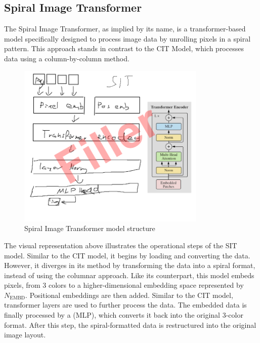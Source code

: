 

\subsection{Spiral Image Transformer}

    The Spiral Image Transformer, as implied by its name, is a transformer-based model specifically designed to process image data by unrolling pixels in a spiral pattern. This approach stands in contrast to the CIT Model, which processes data using a column-by-column method.

    \begin{figure}[H]
        \centering
        \includegraphics[width=0.8\textwidth]{imgs/SITModel.png}
        \caption{Spiral Image Transformer model structure}
        \label{fig:SpiralImageTransformer}
    \end{figure}

    The visual representation above illustrates the operational steps of the SIT model. Similar to the CIT model, it begins by loading and converting the data. However, it diverges in its method by transforming the data into a spiral format, instead of using the columnar approach. Like its counterpart, this model embeds pixels, from 3 colors to a higher-dimensional embedding space represented by \(N_{\text{EMBD}}\). Positional embeddings are then added. Similar to the CIT model, transformer layers are used to further process the data. The embedded data is finally processed by a (MLP), which converts it back into the original 3-color format. After this step, the spiral-formatted data is restructured into the original image layout.

